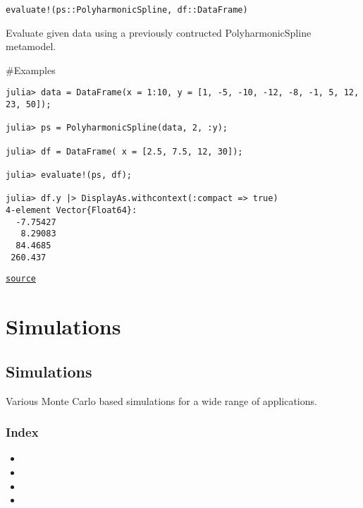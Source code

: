 \begin{adjustwidth}{2em}{0pt}


\begin{verbatim}
evaluate!(ps::PolyharmonicSpline, df::DataFrame)
\end{verbatim}

Evaluate given data using a previously contructed PolyharmonicSpline metamodel.

\#Examples


\begin{verbatim}
julia> data = DataFrame(x = 1:10, y = [1, -5, -10, -12, -8, -1, 5, 12, 23, 50]);

julia> ps = PolyharmonicSpline(data, 2, :y);

julia> df = DataFrame( x = [2.5, 7.5, 12, 30]);

julia> evaluate!(ps, df);

julia> df.y |> DisplayAs.withcontext(:compact => true)
4-element Vector{Float64}:
  -7.75427
   8.29083
  84.4685
 260.437
\end{verbatim}



\href{https://github.com/friesischscott/UncertaintyQuantification.jl/blob/f5ee6cce729f0d6a57979257379c942cdf42f86f/src/models/polyharmonicspline.jl#L70-L92}{\texttt{source}}


\end{adjustwidth}

\chapter{Simulations}


\section{Simulations}



\label{782416527003373519}{}


Various Monte Carlo based simulations for a wide range of applications.



\subsection{Index}



\label{6663683553518785561}{}

\begin{itemize}
\item {}
\item {}
\item {}
\item {}
\end{itemize}


